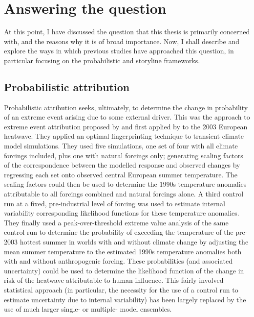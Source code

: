 \section{Answering the question}\label{intro:answering}

  At this point, I have discussed the question that this thesis is primarily concerned with, and the reasons why it is of broad importance. Now, I shall describe and explore the ways in which previous studies have approached this question, in particular focusing on the probabilistic \citep[often ``conventional'',][]{stott_human_2004} and storyline \citep{hoerling_anatomy_2013} frameworks. 

  \subsection{Probabilistic attribution}\label{intro:probabilistic}

    Probabilistic attribution seeks, ultimately, to determine the change in probability of an extreme event arising due to some external driver. This was the approach to extreme event attribution proposed by \citet{allen_liability_2003} and first applied by \citet{stott_human_2004} to the 2003 European heatwave. They applied an optimal fingerprinting technique \citep{hasselmann_optimal_1993,hasselmann_multi-pattern_1997} to transient climate model simulations. They used five simulations, one set of four with all climate forcings included, plus one with natural forcings only; generating scaling factors of the correspondence between the modelled response and observed changes by regressing each set onto observed central European summer temperature. The scaling factors could then be used to determine the 1990s temperature anomalies attributable to all forcings combined and natural forcings alone. A third control run at a fixed, pre-industrial level of forcing was used to estimate internal variability corresponding likelihood functions for these temperature anomalies. They finally used a peak-over-threshold extreme value analysis of the same control run to determine the probability of exceeding the temperature of the pre-2003 hottest summer in worlds with and without climate change by adjusting the mean summer temperature to the estimated 1990s temperature anomalies both with and without anthropogenic forcing. These probabilities (and associated uncertainty) could be used to determine the likelihood function of the change in risk of the heatwave attributable to human influence. This fairly involved statistical approach (in particular, the necessity for the use of a control run to estimate uncertainty due to internal variability) has been largely replaced by the use of much larger single- or multiple- model ensembles.

